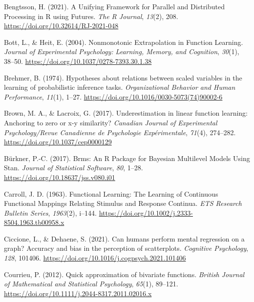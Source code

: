 \documentclass[
  letterpaper,
  DIV=11,
  numbers=noendperiod,
  oneside]{scrartcl}
\newlength{\cslhangindent}
\newenvironment{CSLReferences}[2] %
 {\begin{list}{}{%
  \setlength{\itemindent}{0pt}
  \setlength{\leftmargin}{0pt}
  \setlength{\parsep}{0pt}
  \ifodd #1
   \setlength{\leftmargin}{\cslhangindent}
   \setlength{\itemindent}{-1\cslhangindent}
  \fi
  \setlength{\itemsep}{#2\baselineskip}}}
 {\end{list}}
\begin{document}
\label{refs}
\begin{CSLReferences}{1}{0}
Bengtsson, H. (2021). A {Unifying Framework} for {Parallel} and
{Distributed Processing} in {R} using {Futures}. \emph{The R Journal},
\emph{13}(2), 208. \url{https://doi.org/10.32614/RJ-2021-048}

Bott, L., \& Heit, E. (2004). Nonmonotonic {Extrapolation} in {Function
Learning}. \emph{Journal of Experimental Psychology: Learning, Memory,
and Cognition}, \emph{30}(1), 38--50.
\url{https://doi.org/10.1037/0278-7393.30.1.38}

Brehmer, B. (1974). Hypotheses about relations between scaled variables
in the learning of probabilistic inference tasks. \emph{Organizational
Behavior and Human Performance}, \emph{11}(1), 1--27.
\url{https://doi.org/10.1016/0030-5073(74)90002-6}

Brown, M. A., \& Lacroix, G. (2017). Underestimation in linear function
learning: {Anchoring} to zero or x-y similarity? \emph{Canadian Journal
of Experimental Psychology/Revue Canadienne de Psychologie
Exp{é}rimentale}, \emph{71}(4), 274--282.
\url{https://doi.org/10.1037/cep0000129}

Bürkner, P.-C. (2017). Brms: {An R Package} for {Bayesian Multilevel
Models Using Stan}. \emph{Journal of Statistical Software}, \emph{80},
1--28. \url{https://doi.org/10.18637/jss.v080.i01}

Carroll, J. D. (1963). Functional {Learning}: {The Learning} of
{Continuous Functional Mappings Relating Stimulus} and {Response
Continua}. \emph{ETS Research Bulletin Series}, \emph{1963}(2), i--144.
\url{https://doi.org/10.1002/j.2333-8504.1963.tb00958.x}

Ciccione, L., \& Dehaene, S. (2021). Can humans perform mental
regression on a graph? {Accuracy} and bias in the perception of
scatterplots. \emph{Cognitive Psychology}, \emph{128}, 101406.
\url{https://doi.org/10.1016/j.cogpsych.2021.101406}

Courrieu, P. (2012). Quick approximation of bivariate functions.
\emph{British Journal of Mathematical and Statistical Psychology},
\emph{65}(1), 89--121.
\url{https://doi.org/10.1111/j.2044-8317.2011.02016.x}


\end{CSLReferences}
\end{document}
